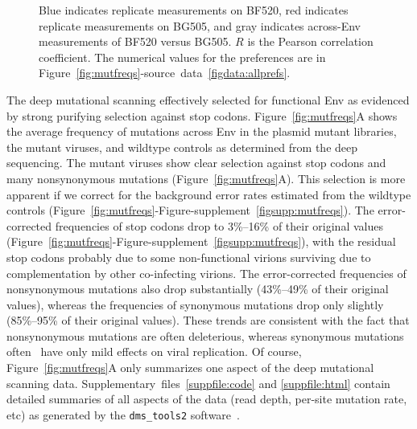 \documentclass[9pt]{elife}
\begin{document}
\begin{figure}
{Blue indicates replicate measurements on BF520, red indicates replicate measurements on BG505, and gray indicates across-Env measurements of BF520 versus BG505.
$R$ is the Pearson correlation coefficient. 
The numerical values for the preferences are in Figure~\ref{fig:mutfreqs}-source~data~\ref{figdata:allprefs}.
}
{}
\end{figure}

The deep mutational scanning effectively selected for functional Env as evidenced by strong purifying selection against stop codons.
Figure~\ref{fig:mutfreqs}A shows the average frequency of mutations across Env in the plasmid mutant libraries, the mutant viruses, and wildtype controls as determined from the deep sequencing.
The mutant viruses show clear selection against stop codons and many nonsynonymous mutations (Figure~\ref{fig:mutfreqs}A).
This selection is more apparent if we correct for the background error rates estimated from the wildtype controls (Figure~\ref{fig:mutfreqs}-Figure-supplement~\ref{figsupp:mutfreqs}).
The error-corrected frequencies of stop codons drop to 3\%--16\% of their original values (Figure~\ref{fig:mutfreqs}-Figure-supplement~\ref{figsupp:mutfreqs}), with the residual stop codons probably due to some non-functional virions surviving due to complementation by other co-infecting virions. 
The error-corrected frequencies of nonsynonymous mutations also drop substantially (43\%--49\% of their original values), whereas the frequencies of synonymous mutations drop only slightly (85\%--95\% of their original values).
These trends are consistent with the fact that nonsynonymous mutations are often deleterious, whereas synonymous mutations often~\citep[although certainly not always, see][]{zanini2013quantifying} have only mild effects on viral replication.
Of course, Figure~\ref{fig:mutfreqs}A only summarizes one aspect of the deep mutational scanning data.
Supplementary~files~\ref{suppfile:code} and \ref{suppfile:html} contain detailed summaries of all aspects of the data (read depth, per-site mutation rate, etc) as generated by the \texttt{dms\_tools2} software~\citep[\url{https://jbloomlab.github.io/dms_tools2/}]{bloom2015software}.
\end{document}
